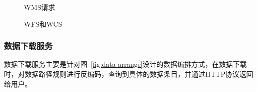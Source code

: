 \begin{figure}[!htbp]
    \centering

    \hfill

    \caption{WMS请求}
    \label{fig:wms-example}
\end{figure}

\begin{figure}[!htbp]
    \centering

    \hfill

    \caption{WFS和WCS}
    \label{fig:wfs-wcs}
\end{figure}

\subsubsection{数据下载服务}
数据下载服务主要是针对图~\ref{fig:data-arrange}设计的数据编排方式，在数据下载时，对数据路径规则进行反编码，查询到具体的数据条目，并通过HTTP协议返回给用户。




